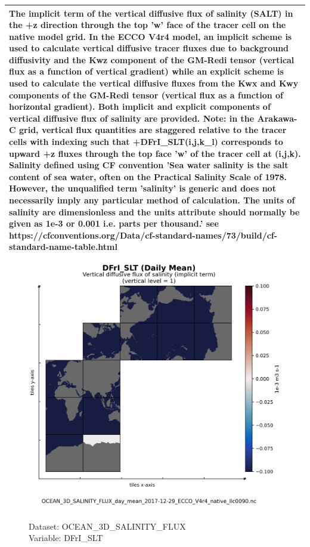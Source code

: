 \begin{longtable}{|p{}|p{}|p{}|p{}|}
\multicolumn{4}{|p{1\textwidth}|}{The implicit term of the vertical diffusive flux of salinity (SALT) in the +z direction through the top 'w' face of the tracer cell on the native model grid. In the ECCO V4r4 model, an implicit scheme is used to calculate vertical diffusive tracer fluxes due to background diffusivity and the Kwz component of the GM-Redi tensor (vertical flux as a function of vertical gradient) while an explicit scheme is used to calculate the vertical diffusive fluxes from the Kwx and Kwy components of the GM-Redi tensor (vertical flux as a function of horizontal gradient). Both implicit and explicit components of vertical diffusive flux of salinity are provided. Note: in the Arakawa-C grid, vertical flux quantities are staggered relative to the tracer cells with indexing such that +DFrI\_SLT(i,j,k\_l) corresponds to upward +z fluxes through the top face 'w' of the tracer cell at (i,j,k). Salinity defined using CF convention 'Sea water salinity is the salt content of sea water, often on the Practical Salinity Scale of 1978. However, the unqualified term 'salinity' is generic and does not necessarily imply any particular method of calculation. The units of salinity are dimensionless and the units attribute should normally be given as 1e-3 or 0.001 i.e. parts per thousand.' see https://cfconventions.org/Data/cf-standard-names/73/build/cf-standard-name-table.html} \\ \hline
\end{longtable}

\begin{figure}[H]
\centering
\includegraphics[scale=0.5]{../images/plots/native_plots/Ocean_Three-Dimensional_Salinity_Fluxes/DFrI_SLT.png}
\caption{\\Dataset: OCEAN\_3D\_SALINITY\_FLUX\\Variable: DFrI\_SLT}
\label{tab:table-OCEAN_3D_SALINITY_FLUX_DFrI_SLT-Plot}
\end{figure}
\pagebreak
